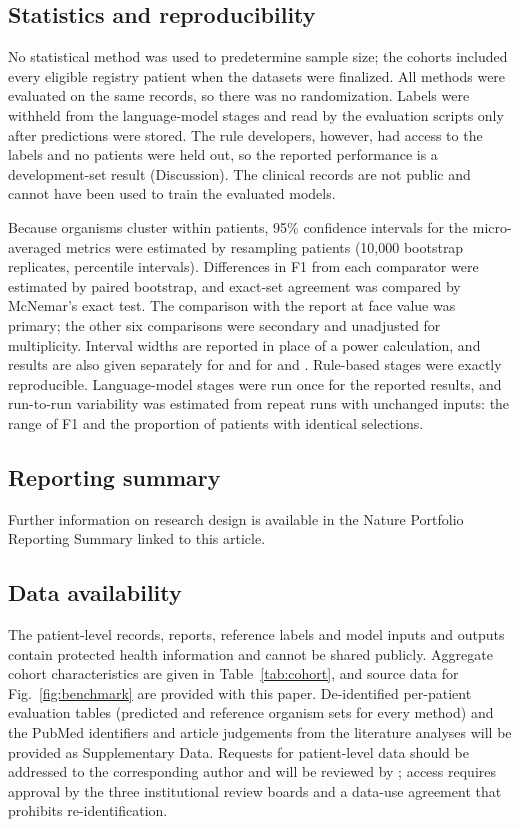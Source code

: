 \subsection*{Statistics and reproducibility}
No statistical method was used to predetermine sample size; the cohorts included every eligible registry patient when the datasets were finalized. All methods were evaluated on the same records, so there was no randomization. Labels were withheld from the language-model stages and read by the evaluation scripts only after predictions were stored. The rule developers, however, had access to the labels and no patients were held out, so the reported performance is a development-set result (Discussion). The clinical records are not public and cannot have been used to train the evaluated models.

Because organisms cluster within patients, 95\% confidence intervals for the micro-averaged metrics were estimated by resampling patients (10,000 bootstrap replicates, percentile intervals). Differences in F1 from each comparator were estimated by paired bootstrap, and exact-set agreement was compared by McNemar's exact test. The comparison with the \mngs report at face value was primary; the other six comparisons were secondary and unadjusted for multiplicity. Interval widths are reported in place of a power calculation, and results are also given separately for \kmuh and for \tvgh and \tsgh. Rule-based stages were exactly reproducible. Language-model stages were run once for the reported results, and run-to-run variability was estimated from repeat runs with unchanged inputs: the range of F1 and the proportion of patients with identical selections. 

\subsection*{Reporting summary}
Further information on research design is available in the Nature Portfolio Reporting Summary linked to this article.

\subsection*{Data availability}
The patient-level records, \mngs reports, reference labels and model inputs and outputs contain protected health information and cannot be shared publicly. Aggregate cohort characteristics are given in Table~\ref{tab:cohort}, and source data for Fig.~\ref{fig:benchmark} are provided with this paper. De-identified per-patient evaluation tables (predicted and reference organism sets for every method) and the PubMed identifiers and article judgements from the literature analyses will be provided as Supplementary Data. Requests for patient-level data should be addressed to the corresponding author and will be reviewed by ; access requires approval by the three institutional review boards and a data-use agreement that prohibits re-identification.

